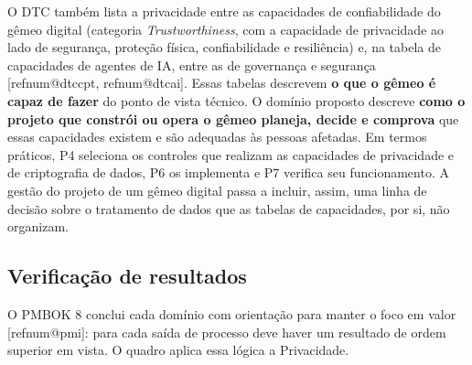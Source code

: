 \documentclass[11pt,a4paper]{article}
\makeatletter
\newcommand{\refnum}[1]{\csname refnum@#1\endcsname}
\makeatother
\begin{document}
O DTC também lista a privacidade entre as capacidades de confiabilidade do gêmeo digital (categoria \textit{Trustworthiness}, com a capacidade de privacidade ao lado de segurança, proteção física, confiabilidade e resiliência) e, na tabela de capacidades de agentes de IA, entre as de governança e segurança [\refnum{dtccpt}, \refnum{dtcai}]. Essas tabelas descrevem \textbf{o que o gêmeo é capaz de fazer} do ponto de vista técnico. O domínio proposto descreve \textbf{como o projeto que constrói ou opera o gêmeo planeja, decide e comprova} que essas capacidades existem e são adequadas às pessoas afetadas. Em termos práticos, P4 seleciona os controles que realizam as capacidades de privacidade e de criptografia de dados, P6 os implementa e P7 verifica seu funcionamento. A gestão do projeto de um gêmeo digital passa a incluir, assim, uma linha de decisão sobre o tratamento de dados que as tabelas de capacidades, por si, não organizam.
\subsection{Verificação de resultados}

O PMBOK 8 conclui cada domínio com orientação para manter o foco em valor [\refnum{pmi}]: para cada saída de processo deve haver um resultado de ordem superior em vista. O quadro aplica essa lógica a Privacidade.
\end{document}
